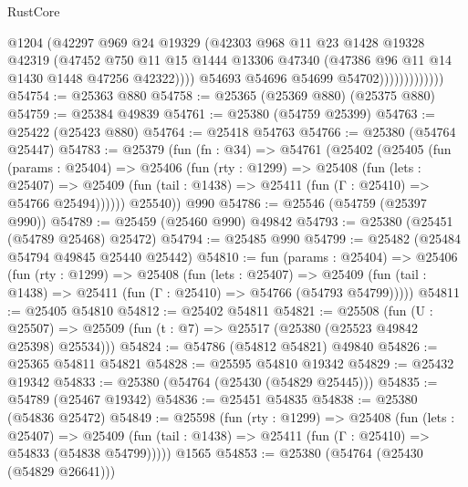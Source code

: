 \begin{lexlean}{RustCore}
\begin{coremodule}
                              @1204
                              (@42297
                                @969
                                @24
                                @19329
                                (@42303
                                  @968
                                  @11
                                  @23
                                  @1428
                                  @19328
                                  @42319
                                  (@47452
                                    @750
                                    @11
                                    @15
                                    @1444
                                    @13306
                                    @47340
                                    (@47386 @96 @11 @14 @1430 @1448 @47256 @42322))))
                              @54693
                              @54696
                              @54699
                              @54702)))))))))))))
@54754 := @25363 @880
@54758 := @25365 (@25369 @880) (@25375 @880)
@54759 := @25384 @49839
@54761 := @25380 (@54759 @25399)
@54763 := @25422 (@25423 @880)
@54764 := @25418 @54763
@54766 := @25380 (@54764 @25447)
@54783 := @25379
    (fun (fn : @34) =>
    @54761
      (@25402
        (@25405
          (fun (params : @25404) =>
          @25406
            (fun (rty : @1299) =>
            @25408
              (fun (lets : @25407) =>
              @25409 (fun (tail : @1438) => @25411 (fun (Γ : @25410) => @54766 @25494))))))
        @25540))
    @990
@54786 := @25546 (@54759 (@25397 @990))
@54789 := @25459 (@25460 @990) @49842
@54793 := @25380 (@25451 (@54789 @25468) @25472)
@54794 := @25485 @990
@54799 := @25482 (@25484 @54794 @49845 @25440 @25442)
@54810 := fun (params : @25404) =>
  @25406
    (fun (rty : @1299) =>
    @25408
      (fun (lets : @25407) =>
      @25409 (fun (tail : @1438) => @25411 (fun (Γ : @25410) => @54766 (@54793 @54799)))))
@54811 := @25405 @54810
@54812 := @25402 @54811
@54821 := @25508
    (fun (U : @25507) => @25509 (fun (t : @7) => @25517 (@25380 (@25523 @49842 @25398) @25534)))
@54824 := @54786 (@54812 @54821) @49840
@54826 := @25365 @54811 @54821
@54828 := @25595 @54810 @19342
@54829 := @25432 @19342
@54833 := @25380 (@54764 (@25430 (@54829 @25445)))
@54835 := @54789 (@25467 @19342)
@54836 := @25451 @54835
@54838 := @25380 (@54836 @25472)
@54849 := @25598
    (fun (rty : @1299) =>
    @25408
      (fun (lets : @25407) =>
      @25409 (fun (tail : @1438) => @25411 (fun (Γ : @25410) => @54833 (@54838 @54799)))))
    @1565
@54853 := @25380 (@54764 (@25430 (@54829 @26641)))

\end{coremodule}
\end{lexlean}
